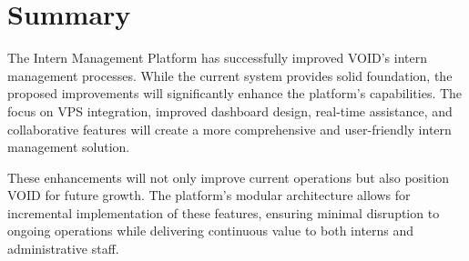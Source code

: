 \section{Summary}

\noindent
The Intern Management Platform has successfully improved VOID's intern management processes. While the current system provides solid foundation, the proposed improvements will significantly enhance the platform's capabilities. The focus on VPS integration, improved dashboard design, real-time assistance, and collaborative features will create a more comprehensive and user-friendly intern management solution.

These enhancements will not only improve current operations but also position VOID for future growth. The platform's modular architecture allows for incremental implementation of these features, ensuring minimal disruption to ongoing operations while delivering continuous value to both interns and administrative staff.